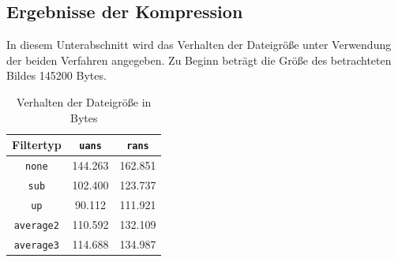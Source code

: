 \documentclass[a4paper,12pt]{article}
\begin{document}
\subsection{Ergebnisse der Kompression}
In diesem Unterabschnitt wird das Verhalten der Dateigröße unter Verwendung der beiden Verfahren angegeben. Zu Beginn beträgt die Größe des betrachteten Bildes
145200 Bytes.
\begin{table}[h]
\begin{center}
\begin{tabular}{c | c | c}
Filtertyp &  {\tt{uans}} & {\tt{rans}}
\\
\hline
{\tt{none}} & 144.263& 162.851
\\
{\tt{sub}} & 102.400 & 123.737 
\\
{\tt{up}} & 90.112 & 111.921
\\
{\tt{average2}} & 110.592 &  132.109
\\
{\tt{average3}} & 114.688 & 134.987
\end{tabular}
\caption{Verhalten der Dateigröße in Bytes}
\end{center}
\end{table}
\end{document}

